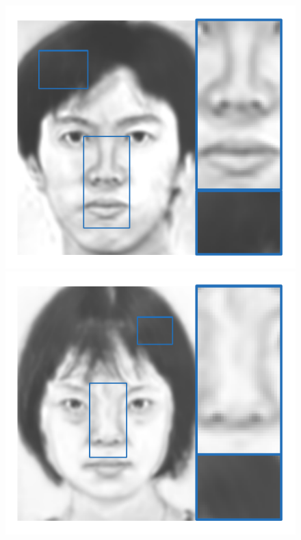 \documentclass[10pt,twocolumn,letterpaper]{article}
\begin{document}
\begin{figure}[htbp]
{\begin{minipage}[b]{0.13\linewidth}
\centering
\includegraphics[width=0.99\linewidth]{img/sketch_result/example1_FCNN.pdf}
\includegraphics[width=0.99\linewidth]{img/sketch_result/example2_FCNN.pdf}
\end{minipage}
}
\end{figure}
\end{document}
